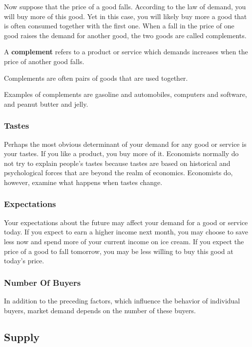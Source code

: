 Now suppose that the price of a good falls. According to the law of demand, you will buy more of this good. Yet in
this case, you will likely buy more a good that is often consumed together with the first one. When a fall in the
price of one good raises the demand for another good, the two goods are called complements.

\bd[Complement]
A \textbf{complement} refers
to a product or service which demands increases when the price of another good falls.
\ed

Complements are often pairs of goods that are used together.

\be
Examples of complements are gasoline and automobiles, computers and software, and peanut butter and jelly.
\ee

\subsubsection*{Tastes}

Perhaps the most obvious determinant of your demand for any good or service is your tastes. If you like a product,
you buy more of it. Economists normally do not try to explain people's tastes because tastes are based on historical
and psychological forces that are beyond the realm of economics. Economists do, however, examine what happens when
tastes change.

\subsubsection*{Expectations}

Your expectations about the future may affect your demand for a good or service today. If you expect to earn a higher
income next month, you may choose to save less now and spend more of your current income on ice cream. If you expect
the price of a good to fall tomorrow, you may be less willing to buy this good at today's price.

\subsubsection*{Number Of Buyers}

In addition to the preceding factors, which influence the behavior of individual buyers, market demand depends on the
number of these buyers.

\subsection{Supply}

